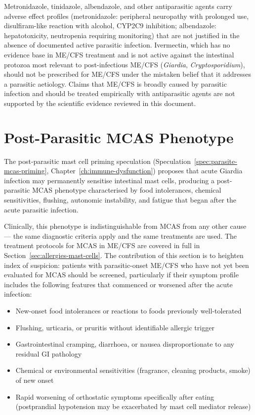 \begin{warning}
\label{warn:no-empirical-antiparasitic}
Metronidazole, tinidazole, albendazole, and other antiparasitic agents carry adverse effect profiles (metronidazole: peripheral neuropathy with prolonged use, disulfiram-like reaction with alcohol, CYP2C9 inhibition; albendazole: hepatotoxicity, neutropenia requiring monitoring) that are not justified in the absence of documented active parasitic infection. Ivermectin, which has no evidence base in ME/CFS treatment and is not active against the intestinal protozoa most relevant to post-infectious ME/CFS (\emph{Giardia}, \emph{Cryptosporidium}), should not be prescribed for ME/CFS under the mistaken belief that it addresses a parasitic aetiology. Claims that ME/CFS is broadly caused by parasitic infection and should be treated empirically with antiparasitic agents are not supported by the scientific evidence reviewed in this document.
\end{warning}

\section{Post-Parasitic MCAS Phenotype}
\label{sec:post-parasitic-mcas}

The post-parasitic mast cell priming speculation (Speculation~\ref{spec:parasite-mcas-priming}, Chapter~\ref{ch:immune-dysfunction}) proposes that acute Giardia infection may permanently sensitise intestinal mast cells, producing a post-parasitic MCAS phenotype characterised by food intolerances, chemical sensitivities, flushing, autonomic instability, and fatigue that began after the acute parasitic infection.

Clinically, this phenotype is indistinguishable from MCAS from any other cause --- the same diagnostic criteria apply and the same treatments are used. The treatment protocols for MCAS in ME/CFS are covered in full in Section~\ref{sec:allergies-mast-cells}. The contribution of this section is to heighten index of suspicion: patients with parasitic-onset ME/CFS who have not yet been evaluated for MCAS should be screened, particularly if their symptom profile includes the following features that commenced or worsened after the acute infection:

\begin{itemize}
  \item New-onset food intolerances or reactions to foods previously well-tolerated
  \item Flushing, urticaria, or pruritis without identifiable allergic trigger
  \item Gastrointestinal cramping, diarrhoea, or nausea disproportionate to any residual GI pathology
  \item Chemical or environmental sensitivities (fragrance, cleaning products, smoke) of new onset
  \item Rapid worsening of orthostatic symptoms specifically after eating (postprandial hypotension may be exacerbated by mast cell mediator release)
\end{itemize}

